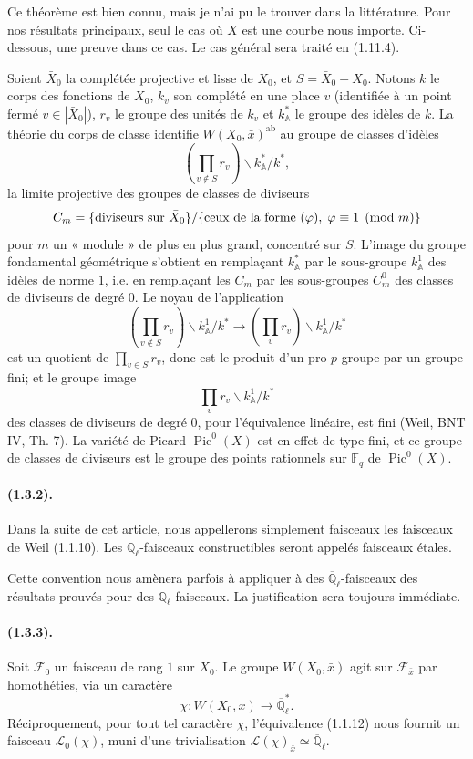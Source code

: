 \documentclass[11pt]{article}
\theoremstyle{remark}
\newcommand{\Ql}{\mathbb{Q}_\ell}
\newcommand{\Qlb}{\overline{\mathbb{Q}}_\ell}
\newcommand{\Fq}{\mathbb{F}_q}
\newcommand{\Pic}{\operatorname{Pic}}
\begin{document}
Ce théorème est bien connu, mais je n'ai pu le trouver dans la littérature. Pour nos résultats principaux, seul le cas où $X$ est une courbe nous importe. Ci-dessous, une preuve dans ce cas. Le cas général sera traité en (1.11.4).

Soient $\bar X_0$ la complétée projective et lisse de $X_0$, et $S=\bar X_0-X_0$. Notons $k$ le corps des fonctions de $X_0$, $k_v$ son complété en une place $v$ (identifiée à un point fermé $v\in |\bar X_0|$), $r_v$ le groupe des unités de $k_v$ et $k_{\mathbb A}^*$ le groupe des idèles de $k$. La théorie du corps de classe identifie $W(X_0,\bar x)^{\mathrm{ab}}$ au groupe de classes d'idèles
\[
\left(\prod_{v\notin S}r_v\right)\backslash k_{\mathbb A}^*/k^*,
\]
la limite projective des groupes de classes de diviseurs
\[
C_m=\{\hbox{diviseurs sur }\bar X_0\}/\{\hbox{ceux de la forme }(\varphi),\; \varphi\equiv 1\pmod m\}
\]
pour $m$ un « module » de plus en plus grand, concentré sur $S$. L'image du groupe fondamental géométrique s'obtient en remplaçant $k_{\mathbb A}^*$ par le sous-groupe $k_{\mathbb A}^{1}$ des idèles de norme $1$, i.e. en remplaçant les $C_m$ par les sous-groupes $C_m^0$ des classes de diviseurs de degré $0$. Le noyau de l'application
\[
\left(\prod_{v\notin S}r_v\right)\backslash k_{\mathbb A}^{1}/k^*
\longrightarrow
\left(\prod_v r_v\right)\backslash k_{\mathbb A}^{1}/k^*
\]
est un quotient de $\prod_{v\in S} r_v$, donc est le produit d'un pro-$p$-groupe par un groupe fini; et le groupe image
\[
\prod_v r_v\backslash k_{\mathbb A}^{1}/k^*
\]
des classes de diviseurs de degré $0$, pour l'équivalence linéaire, est fini (Weil, BNT IV, Th. 7). La variété de Picard $\Pic^0(X)$ est en effet de type fini, et ce groupe de classes de diviseurs est le groupe des points rationnels sur $\Fq$ de $\Pic^0(X)$.

\paragraph{(1.3.2).} Dans la suite de cet article, nous appellerons simplement faisceaux les faisceaux de Weil (1.1.10). Les $\Ql$-faisceaux constructibles seront appelés faisceaux étales.

Cette convention nous amènera parfois à appliquer à des $\Qlb$-faisceaux des résultats prouvés pour des $\Ql$-faisceaux. La justification sera toujours immédiate.

\paragraph{(1.3.3).} Soit $\mathcal F_0$ un faisceau de rang $1$ sur $X_0$. Le groupe $W(X_0,\bar x)$ agit sur $\mathcal F_{\bar x}$ par homothéties, via un caractère
\[
\chi:W(X_0,\bar x)\longrightarrow\Qlb^*.
\]
Réciproquement, pour tout tel caractère $\chi$, l'équivalence (1.1.12) nous fournit un faisceau $\mathcal L_0(\chi)$, muni d'une trivialisation $\mathcal L(\chi)_{\bar x}\simeq\Qlb$.
\end{document}
